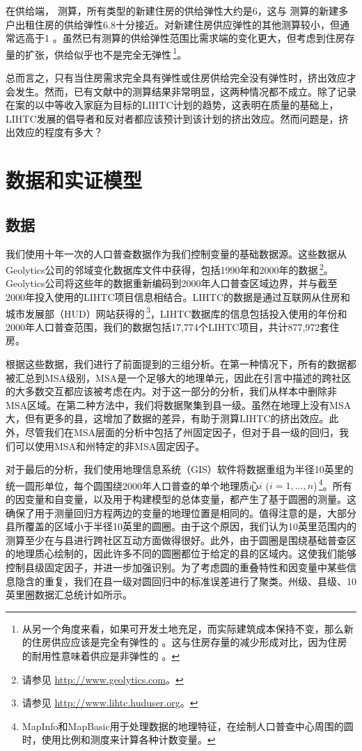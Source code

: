 \documentclass[lang=cn,11pt,a4paper]{paper}
\begin{document}
在供给端，\cite{Mayer200085} 测算，所有类型的新建住房的供给弹性大约是6，这与 \cite{DiPasquale1992337} 测算的新建多户出租住房的供给弹性6.8十分接近。对新建住房供应弹性的其他测算较小，但通常远高于1 \citep{DiPasquale1992337,Rosen19791}。虽然已有测算的供给弹性范围比需求端的变化更大，但考虑到住房存量的扩张，供给似乎也不是完全无弹性\,\footnote{从另一个角度来看，如果可开发土地充足，而实际建筑成本保持不变，那么新的住房供应应该是完全有弹性的 \citep{Rosenthal1994182}。这与住房存量的减少形成对比，因为住房的耐用性意味着供应是非弹性的 \citep{Glaeser2005345}。}。

总而言之，只有当住房需求完全具有弹性或住房供给完全没有弹性时，挤出效应才会发生。然而，已有文献中的测算结果非常明显，这两种情况都不成立。除了记录在案的以中等收入家庭为目标的LIHTC计划的趋势，这表明在质量的基础上，LIHTC发展的倡导者和反对者都应该预计到该计划的挤出效应。然而问题是，挤出效应的程度有多大？

\section{数据和实证模型}\label{sec4}

\subsection{数据}

我们使用十年一次的人口普查数据作为我们控制变量的基础数据源。这些数据从Geolytics公司的邻域变化数据库文件中获得，包括1990年和2000年的数据\,\footnote{请参见 \url{http://www.geolytics.com}。}。Geolytics公司将这些年的数据重新编码到2000年人口普查区域边界，并与截至2000年投入使用的LIHTC项目信息相结合。LIHTC的数据是通过互联网从住房和城市发展部（HUD）网站获得的\,\footnote{请参见 \url{http://www.lihtc.huduser.org}。}，LIHTC数据库的信息包括投入使用的年份和2000年人口普查范围，我们的数据包括17,774个LIHTC项目，共计877,972套住房。

根据这些数据，我们进行了前面提到的三组分析。在第一种情况下，所有的数据都被汇总到MSA级别，MSA是一个足够大的地理单元，因此在引言中描述的跨社区的大多数交互都应该被考虑在内。对于这一部分的分析，我们从样本中删除非MSA区域。在第二种方法中，我们将数据聚集到县一级。虽然在地理上没有MSA大，但有更多的县，这增加了数据的差异，有助于测算LIHTC的挤出效应。此外，尽管我们在MSA层面的分析中包括了州固定因子，但对于县一级的回归，我们可以使用MSA和州特定的非MSA固定因子。

对于最后的分析，我们使用地理信息系统（GIS）软件将数据重组为半径10英里的统一圆形单位，每个圆围绕2000年人口普查的单个地理质心$i$ ($i = 1, \dots,n$)\,\footnote{MapInfo和MapBasic用于处理数据的地理特征，在绘制人口普查中心周围的圆时，使用比例和测度来计算各种计数变量。}。所有的因变量和自变量，以及用于构建模型的总体变量，都产生了基于圆圈的测量。这确保了用于测量回归方程两边的变量的地理位置是相同的。值得注意的是，大部分县所覆盖的区域小于半径10英里的圆圈。由于这个原因，我们认为10英里范围内的测算至少在与县进行跨社区互动方面做得很好。此外，由于圆圈是围绕基础普查区的地理质心绘制的，因此许多不同的圆圈都位于给定的县的区域内。这使我们能够控制县级固定因子，并进一步加强识别。为了考虑圆的重叠特性和因变量中某些信息隐含的重复，我们在县一级对圆回归中的标准误差进行了聚类。州级、县级、10英里圈数据汇总统计如所示。
\end{document}
